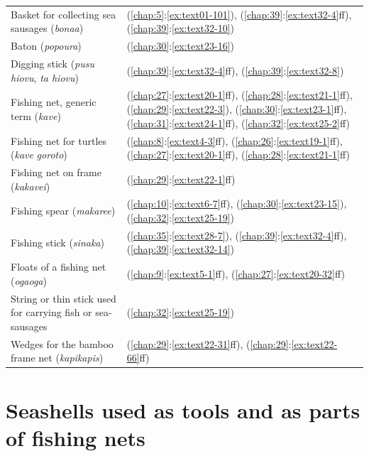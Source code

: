 \begin{tabularx}{\textwidth}{p{7cm}X}
    Basket for collecting sea sausages (\textit{bonaa})&(\ref{chap:5}:\ref{ex:text01-101}), (\ref{chap:39}:\ref{ex:text32-4}ff), (\ref{chap:39}:\ref{ex:text32-10})\\
    Baton (\textit{popoura})&(\ref{chap:30}:\ref{ex:text23-16})\\
    Digging stick (\textit{pusu hiovu}, \textit{ta hiovu})&(\ref{chap:39}:\ref{ex:text32-4}ff), (\ref{chap:39}:\ref{ex:text32-8})\\
    Fishing net, generic term (\textit{kave})&(\ref{chap:27}:\ref{ex:text20-1}ff), (\ref{chap:28}:\ref{ex:text21-1}ff), (\ref{chap:29}:\ref{ex:text22-3}), (\ref{chap:30}:\ref{ex:text23-1}ff), (\ref{chap:31}:\ref{ex:text24-1}ff), (\ref{chap:32}:\ref{ex:text25-2}ff)\\
    Fishing net for turtles (\textit{kave} \textit{goroto})&(\ref{chap:8}:\ref{ex:text4-3}ff), (\ref{chap:26}:\ref{ex:text19-1}ff), (\ref{chap:27}:\ref{ex:text20-1}ff), (\ref{chap:28}:\ref{ex:text21-1}ff)\\
    Fishing net on frame (\textit{kakavei})&(\ref{chap:29}:\ref{ex:text22-1}ff)\\
    Fishing spear (\textit{makaree})&(\ref{chap:10}:\ref{ex:text6-7}ff), (\ref{chap:30}:\ref{ex:text23-15}), (\ref{chap:32}:\ref{ex:text25-19})\\
    Fishing stick (\textit{sinaka})&(\ref{chap:35}:\ref{ex:text28-7}), (\ref{chap:39}:\ref{ex:text32-4}ff), (\ref{chap:39}:\ref{ex:text32-14})\\
    Floats of a fishing net (\textit{ogaoga})&(\ref{chap:9}:\ref{ex:text5-1}ff), (\ref{chap:27}:\ref{ex:text20-32}ff)\\
    String or thin stick used for carrying fish or sea-sausages&(\ref{chap:32}:\ref{ex:text25-19})\\
    Wedges for the bamboo frame net (\textit{kapikapis})&(\ref{chap:29}:\ref{ex:text22-31}ff), (\ref{chap:29}:\ref{ex:text22-66}ff)\\
\end{tabularx}

\section{Seashells used as tools and as parts of fishing nets}\label{ind:seashells}

